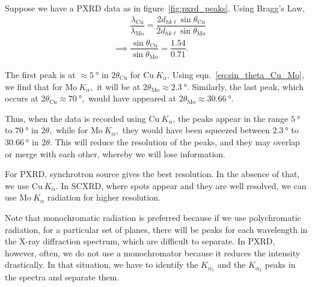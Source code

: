Suppose we have a PXRD data as in figure~\ref{fig:pxrd_peaks}. Using Bragg's Law,%
%
\begin{align}
&\phantom{\implies} \dfrac{\lambda_\mathrm{Cu}}{\lambda_\mathrm{Mo}} = \dfrac{2 d_{hk\ell} \sin \theta_\mathrm{Cu}}{2 d_{hk\ell} \sin \theta_\mathrm{Mo}} \nonumber \\[0.8em]
&\implies \dfrac{\sin \theta_\mathrm{Cu}}{\sin \theta_\mathrm{Mo}} = \dfrac{1.54}{0.71}. \label{eq:sin_theta_Cu_Mo}
\end{align}

The first peak is at $\approx \SI{5}{\degree}$ in $2\theta_\mathrm{Cu}$ for $\mathrm{Cu}~K_\alpha$. Using eqn.~\eqref{eq:sin_theta_Cu_Mo}, we find that for $\mathrm{Mo}~K_\alpha,$ it will be at $2\theta_\mathrm{Mo} \approx \SI{2.3}{\degree}.$ Similarly, the last peak, which occurs at $2\theta_\mathrm{Cu} \approx \SI{70}{\degree},$ would have appeared at $2\theta_\mathrm{Mo} \approx \SI{30.66}{\degree}.$

Thus, when the data is recorded using $\mathrm{Cu}~K_\alpha$, the peaks appear in the range $\SI{5}{\degree}$ to $\SI{70}{\degree}$ in $2\theta,$ while for $\mathrm{Mo}~K_\alpha,$ they would have been squeezed between $\SI{2.3}{\degree}$ to $\SI{30.66}{\degree}$ in $2\theta.$ This will reduce the resolution of the peaks, and they may overlap or merge with each other, whereby we will lose information.

For PXRD, synchrotron source gives the best resolution. In the absence of that, we use $\mathrm{Cu}~K_\alpha.$ In SCXRD, where spots appear and they are well resolved, we can use $\mathrm{Mo}~K_\alpha$ radiation for higher resolution.

Note that monochromatic radiation is preferred because if we use polychromatic radiation, for a particular set of planes, there will be peaks for each wavelength in the X-ray diffraction spectrum, which are difficult to separate. In PXRD, however, often, we do not use a monochromator because it reduces the intensity drastically. In that situation, we have to identify the $K_{\alpha_1}$ and the $K_{\alpha_2}$ peaks in the spectra and separate them.